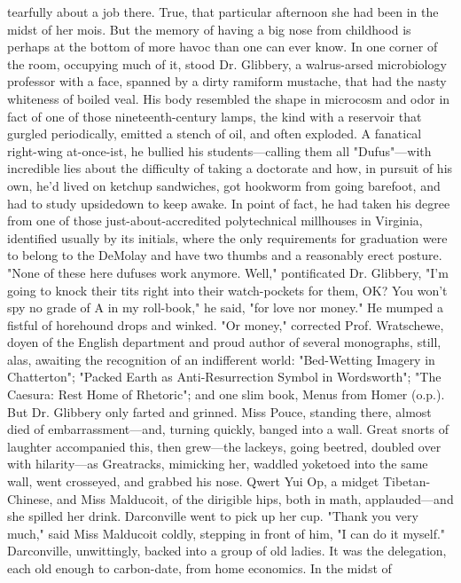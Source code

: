 tearfully about a job there. True, that particular afternoon she had been in the
midst of her mois. But the memory of having a big nose from childhood is perhaps
at the bottom of more havoc than one can ever know.
  In one corner of the room, occupying much of it, stood Dr. Glibbery, a
walrus-arsed microbiology professor with a face, spanned by a dirty ramiform
mustache, that had the nasty whiteness of boiled veal. His body resembled the
shape in microcosm and odor in fact of one of those nineteenth-century lamps,
the kind with a reservoir that gurgled periodically, emitted a stench of oil,
and often exploded. A fanatical right-wing at-once-ist, he bullied his
students---calling them all "Dufus"---with incredible lies about the difficulty of
taking a doctorate and how, in pursuit of his own, he'd lived on ketchup
sandwiches, got hookworm from going barefoot, and had to study upsidedown to
keep awake. In point of fact, he had taken his degree from one of those
just-about-accredited polytechnical millhouses in Virginia, identified usually
by its initials, where the only requirements for graduation were to belong to
the DeMolay and have two thumbs and a reasonably erect posture.
  "None of these here dufuses work anymore. Well," pontificated Dr. Glibbery,
"I'm going to knock their tits right into their watch-pockets for them, OK? You
won't spy no grade of A in my roll-book," he said, "for love nor money."
  He mumped a fistful of horehound drops and winked.
  "Or money," corrected Prof. Wratschewe, doyen of the English department and
proud author of several monographs, still, alas, awaiting the recognition of an
indifferent world: "Bed-Wetting Imagery in Chatterton"; "Packed Earth as
Anti-Resurrection Symbol in Wordsworth"; "The Caesura: Rest Home of Rhetoric";
and one slim book, Menus from Homer (o.p.).
  But Dr. Glibbery only farted and grinned.
  Miss Pouce, standing there, almost died of embarrassment---and, turning quickly,
banged into a wall. Great snorts of laughter accompanied this, then grew---the
lackeys, going beetred, doubled over with hilarity---as Greatracks, mimicking her,
waddled yoketoed into the same wall, went crosseyed, and grabbed his nose. Qwert
Yui Op, a midget Tibetan-Chinese, and Miss Malducoit, of the dirigible hips,
both in math, applauded---and she spilled her drink. Darconville went to pick up
her cup. "Thank you very much," said Miss Malducoit coldly, stepping in front of
him, "I can do it myself."
  Darconville, unwittingly, backed into a group of old ladies. It was the
delegation, each old enough to carbon-date, from home economics. In the midst of
